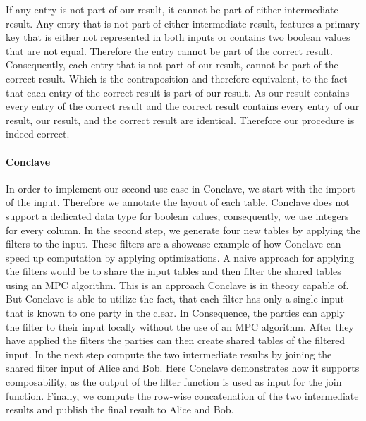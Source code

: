 If any entry is not part of our result, it cannot be part of either intermediate result. Any entry that is not part of either intermediate result, features a primary key that is either not represented in both inputs or contains two boolean values that are not equal.
Therefore the entry cannot be part of the correct result. Consequently, each entry that is not part of our result, cannot be part of the correct result. Which is the contraposition and therefore equivalent, to the fact that each entry of the correct result is part of our result. 
As our result contains every entry of the correct result and the correct result contains every entry of our result, our result, and the correct result are identical. Therefore our procedure is indeed correct.

\paragraph{Conclave}
In order to implement our second use case in Conclave, we start with the import of the input. Therefore we annotate the layout of each table. Conclave does not support a dedicated data type for boolean values, consequently, we use integers for every column. In the second step, we generate four new tables by applying the filters to the input. These filters are a showcase example of how Conclave can speed up computation by applying optimizations.
A naive approach for applying the filters would be to share the input tables and then filter the shared tables using an MPC algorithm. This is an approach Conclave is in theory capable of. But Conclave is able to utilize the fact, that each filter has only a single input that is known to one party in the clear. In Consequence, the parties can apply the filter to their input locally without the use of an MPC algorithm. After they have applied the filters the parties can then create shared tables of the filtered input. In the next step compute the two intermediate results by joining the shared filter input of Alice and Bob. Here Conclave demonstrates how it supports composability, as the output of the filter function is used as input for the join function.  
Finally, we compute the row-wise concatenation of the two intermediate results and publish the final result to Alice and Bob.   
